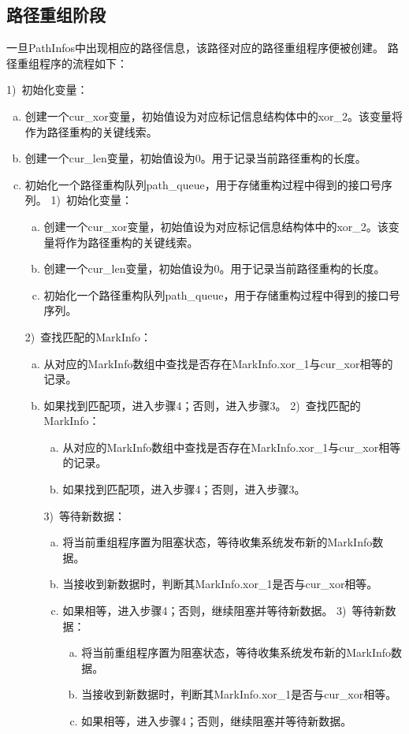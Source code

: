 \begin{enumerate}[a.]
\begin{enumerate}[a.]
\subsection{路径重组阶段}
一旦PathInfos中出现相应的路径信息，该路径对应的路径重组程序便被创建。
路径重组程序的流程如下：\par
1)~初始化变量：\par
\begin{enumerate}[a.]
	\item 创建一个cur\_xor变量，初始值设为对应标记信息结构体中的xor\_2。该变量将作为路径重构的关键线索。
	\item 创建一个cur\_len变量，初始值设为0。用于记录当前路径重构的长度。
	\item 初始化一个路径重构队列path\_queue，用于存储重构过程中得到的接口号序列。
1)~初始化变量：\par
\begin{enumerate}[a.]
	\item 创建一个cur\_xor变量，初始值设为对应标记信息结构体中的xor\_2。该变量将作为路径重构的关键线索。
	\item 创建一个cur\_len变量，初始值设为0。用于记录当前路径重构的长度。
	\item 初始化一个路径重构队列path\_queue，用于存储重构过程中得到的接口号序列。
\end{enumerate}

2)~查找匹配的MarkInfo：\par
\begin{enumerate}[a.]
	\item 从对应的MarkInfo数组中查找是否存在MarkInfo.xor\_1与cur\_xor相等的记录。
	\item 如果找到匹配项，进入步骤4；否则，进入步骤3。
2)~查找匹配的MarkInfo：\par
\begin{enumerate}[a.]
	\item 从对应的MarkInfo数组中查找是否存在MarkInfo.xor\_1与cur\_xor相等的记录。
	\item 如果找到匹配项，进入步骤4；否则，进入步骤3。
\end{enumerate}

3)~等待新数据：\par
\begin{enumerate}[a.]
	\item 将当前重组程序置为阻塞状态，等待收集系统发布新的MarkInfo数据。
	\item 当接收到新数据时，判断其MarkInfo.xor\_1是否与cur\_xor相等。
	\item 如果相等，进入步骤4；否则，继续阻塞并等待新数据。
3)~等待新数据：\par
\begin{enumerate}[a.]
	\item 将当前重组程序置为阻塞状态，等待收集系统发布新的MarkInfo数据。
	\item 当接收到新数据时，判断其MarkInfo.xor\_1是否与cur\_xor相等。
	\item 如果相等，进入步骤4；否则，继续阻塞并等待新数据。
\end{enumerate}


\end{enumerate}
\end{enumerate}
\end{enumerate}
\end{enumerate}
\end{enumerate}
